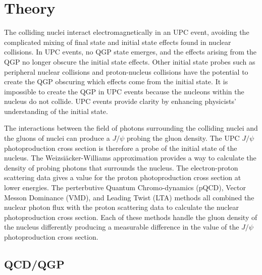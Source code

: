 \chapter{Theory}
    The colliding nuclei interact electromagnetically in an UPC event, avoiding
      the complicated mixing of final state and initial state effects found 
      in nuclear collisions.
    In UPC events, no QGP state emerges, and the effects arising from the QGP 
      no longer obscure the initial state effects.
    Other initial state probes such as peripheral nuclear collisions and 
      proton-nucleus collisions have the potential to create the QGP obscuring 
      which effects come from the initial state.
    It is impossible to create the QGP in UPC events because the nucleons 
      within the nucleus do not collide. 
    UPC events provide clarity by enhancing physicists' 
      understanding of the initial state. 
    
    The interactions between the field of photons surrounding the colliding 
      nuclei and the gluons of nuclei can produce a $J/\psi$ probing the 
      gluon density.
    The UPC $J/\psi$ photoproduction cross section is therefore a probe of 
      the initial state of the nucleus. 
    The Weizsi\"{a}cker-Williams approximation provides a way to calculate the 
      density of probing photons that surrounds the nucleus. 
    The electron-proton scattering data gives a value for the proton 
      photoproduction cross section at lower energies.
    The perterbutive Quantum Chromo-dynamics (pQCD), Vector Messon Dominance 
      (VMD), and Leading Twist (LTA) methods all combined the nuclear photon 
      flux with the proton scattering data to calculate the nuclear 
      photoproduction cross section.
    Each of these methods handle the gluon density of the nucleus differently 
      producing a measurable difference in the value of the $J/\psi$ 
      photoproduction cross section. 

  \section{QCD/QGP}


